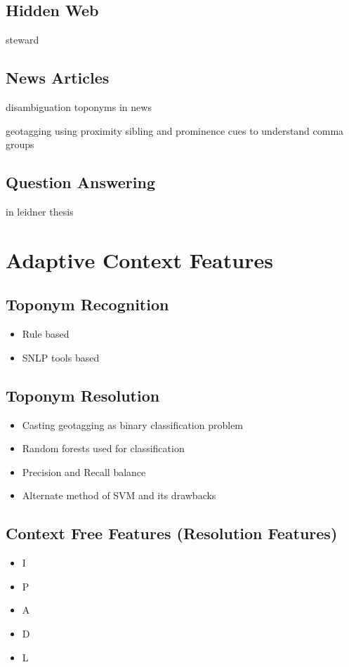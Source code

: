 \documentclass[
     11pt,         %
     a4paper,      %
     oneside,
     ]{article}
\begin{document}
\subsection{Hidden Web} steward
\subsection{News Articles} 

disambiguation toponyms in news

geotagging using proximity sibling and prominence cues to understand comma groups

\subsection{Question Answering} in leidner thesis

\section{Adaptive Context Features}\label{sec:acf}


\subsection{Toponym Recognition}\label{subsec:titlepage}
\begin{itemize}
	\item Rule based
	\item SNLP tools based
\end{itemize}
\subsection{Toponym Resolution}
\begin{itemize}
	\item Casting geotagging as binary classification problem
	\item Random forests used for classification
	\item Precision and Recall balance
	\item Alternate method of SVM and its drawbacks
\end{itemize}
\subsection{Context Free Features (Resolution Features)}
\begin{itemize}
	\item I
	\item P
	\item A
	\item D
	\item L
\end{itemize}
\end{document}
